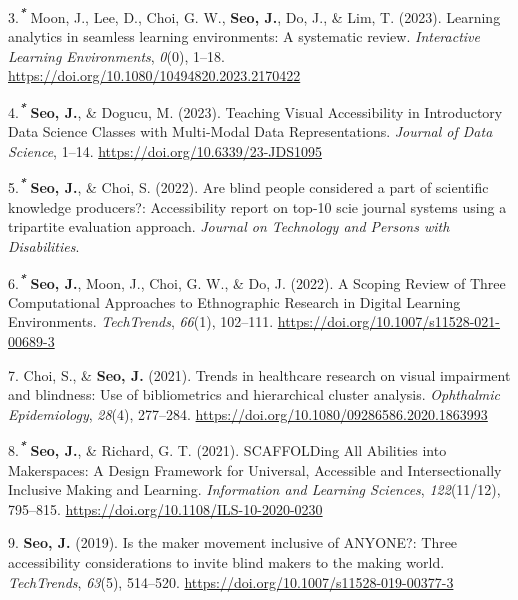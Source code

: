 \documentclass[11pt,a4paper,]{awesome-cv}
\begin{document}
\leavevmode\hypertarget{ref-moonLearningAnalyticsSeamless2023a}{}%
3.\textsuperscript{\emph{\textbf{*}}} Moon, J., Lee, D., Choi, G. W.,
\textbf{Seo, J.}, Do, J., \& Lim, T. (2023). Learning analytics in
seamless learning environments: A systematic review. \emph{Interactive
  Learning Environments}, \emph{0}(0), 1--18.
\url{https://doi.org/10.1080/10494820.2023.2170422}

\leavevmode\hypertarget{ref-seoTeachingVisualAccessibility2023}{}%
4.\textsuperscript{\emph{\textbf{*}}} \textbf{Seo, J.}, \& Dogucu, M.
(2023). Teaching Visual Accessibility in Introductory Data Science
Classes with Multi-Modal Data Representations. \emph{Journal of Data
  Science}, 1--14. \url{https://doi.org/10.6339/23-JDS1095}

\leavevmode\hypertarget{ref-seo2022csun}{}%
5.\textsuperscript{\emph{\textbf{*}}} \textbf{Seo, J.}, \& Choi, S.
(2022). Are blind people considered a part of scientific knowledge
producers?: Accessibility report on top-10 scie journal systems using a
tripartite evaluation approach. \emph{Journal on Technology and Persons
  with Disabilities}.

\leavevmode\hypertarget{ref-seoScopingReviewThree2022}{}%
6.\textsuperscript{\emph{\textbf{*}}} \textbf{Seo, J.}, Moon, J., Choi,
G. W., \& Do, J. (2022). A Scoping Review of Three Computational
Approaches to Ethnographic Research in Digital Learning Environments.
\emph{TechTrends}, \emph{66}(1), 102--111.
\url{https://doi.org/10.1007/s11528-021-00689-3}

\leavevmode\hypertarget{ref-doi:10.1080ux2f09286586.2020.1863993}{}%
7. Choi, S., \& \textbf{Seo, J.} (2021). Trends in healthcare research
on visual impairment and blindness: Use of bibliometrics and
hierarchical cluster analysis. \emph{Ophthalmic Epidemiology},
\emph{28}(4), 277--284.
\url{https://doi.org/10.1080/09286586.2020.1863993}

\leavevmode\hypertarget{ref-seoSCAFFOLDingAllAbilities2021a}{}%
8.\textsuperscript{\emph{\textbf{*}}} \textbf{Seo, J.}, \& Richard, G.
T. (2021). SCAFFOLDing All Abilities into Makerspaces: A Design
Framework for Universal, Accessible and Intersectionally Inclusive
Making and Learning. \emph{Information and Learning Sciences},
\emph{122}(11/12), 795--815.
\url{https://doi.org/10.1108/ILS-10-2020-0230}

\leavevmode\hypertarget{ref-seo2019maker}{}%
9. \textbf{Seo, J.} (2019). Is the maker movement inclusive of ANYONE?:
Three accessibility considerations to invite blind makers to the making
world. \emph{TechTrends}, \emph{63}(5), 514--520.
\url{https://doi.org/10.1007/s11528-019-00377-3}
\end{document}
